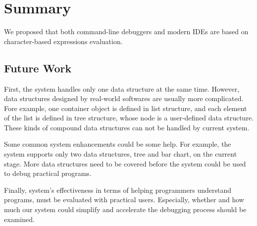 \chapter {Summary}
\label {Summary}

We proposed that both command-line debuggers and modern IDEs are based on character-based expressions evaluation.

\section {Future Work}
First, the system handles only one data structure at the same time. However, data structures designed by real-world softwares are usually more complicated. Fore example, one container object is defined in list structure, and each element of the list is defined in tree structure, whose node is a user-defined data structure. These kinds of compound data structures can not be handled by current system.

Some common system enhancements could be some help. For example, the system supports only two data structures, tree and bar chart, on the current stage. More data structures need to be covered before the system could be used to debug practical programs.

Finally, system's effectiveness in terms of helping programmers understand programs, must be evaluated with practical users. Especially, whether and how much our system could simplify and accelerate the debugging process should be examined.